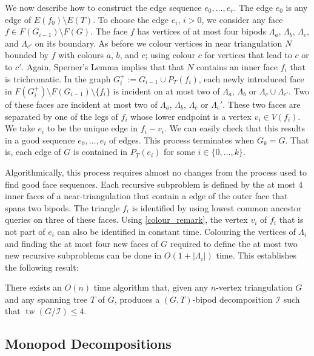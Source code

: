 \documentclass{patmorin}
\DeclareMathOperator{\tw}{tw}
\begin{document}
We now describe how to construct the edge sequence $e_0,\ldots,e_r$.  The edge $e_0$ is any edge of $E(f_0)\setminus E(T)$.  To choose the edge $e_i$, $i>0$, we consider any face $f\in F(G_{i-1})\setminus F(G)$.  The face $f$ has vertices of at most four bipods $\Lambda_a$, $\Lambda_b$, $\Lambda_c$, and $\Lambda_{c'}$ on its boundary.  As before we colour vertices in near triangulation $N$ bounded by $f$ with colours $a$, $b$, and $c$; using colour $c$ for vertices that lead to $c$ or to $c'$.  Again, Sperner's Lemma implies that that $N$ contains an inner face $f_i$ that is trichromatic.  In the graph $G_i^+:=G_{i-1}\cup P_T(f_i)$, each newly introduced face in $F(G_{i}^+)\setminus F(G_{i-1})\setminus\{f_i\}$ is incident on at most two of $\Lambda_a$, $\Lambda_b$ or $\Lambda_{c}\cup \Lambda_{c'}$.  Two of these faces are incident at most two of $\Lambda_a$, $\Lambda_b$, $\Lambda_c$ or $\Lambda_c'$.  These two faces are separated by one of the legs of $f_i$ whose lower endpoint is a vertex $v_i\in V(f_i)$.  We take $e_i$ to be the unique edge in $f_i-v_i$.  We can easily check that this results in a good sequence $e_0,\ldots,e_i$ of edges.  This process terminates when $G_k=G$.  That is, each edge of $G$ is contained in $P_T(e_i)$ for some $i\in\{0,\ldots,k\}$.

Algorithmically, this process requires almost no changes from the process used to find good face sequences.  Each recursive subproblem is defined by the at most $4$ inner faces of a near-triangulation that contain a edge of the outer face that spans two bipods.  The triangle $f_i$ is identified by using lowest common ancestor queries on three of these faces.  Using \cref{colour_remark}, the vertex $v_i$ of $f_i$ that is not part of $e_i$ can also be identified in constant time.  Colouring the vertices of $\Lambda_i$ and finding the at most four new faces of $G$ required to define the at most two new recursive subproblems can be done in $O(1+|\Lambda_i|)$ time.  This establishes the following result:

\begin{thm}
  There exists an $O(n)$ time algorithm that, given any $n$-vertex triangulation $G$ and any spanning tree $T$ of $G$, produces a $(G,T)$-bipod decomposition $\mathcal{I}$ such that $\tw(G/\mathcal{I})\le 4$.
\end{thm}


\subsection{Monopod Decompositions}
\end{document}
